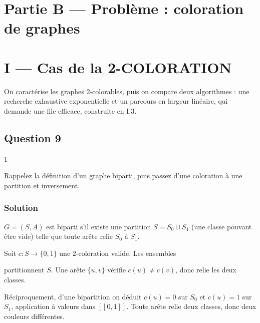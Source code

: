 \documentclass[11pt,a4paper]{article}
\newcommand{\equationajustee}[1]{%
  \sbox{\boiteequation}{$\displaystyle #1$}%
  \ifdim\wd\boiteequation>\linewidth
    \[\resizebox{\linewidth}{!}{\usebox{\boiteequation}}\]%
  \else
    \[#1\]%
  \fi}
\begin{document}
\hypertarget{partie-b-probluxe8me-coloration-de-graphes}{%
\section{Partie B --- Problème : coloration de graphes}\label{partie-b-probluxe8me-coloration-de-graphes}}

\hypertarget{i-cas-de-la-2-coloration}{%
\section{I --- Cas de la 2-COLORATION}\label{i-cas-de-la-2-coloration}}

On caractérise les graphes 2-colorables, puis on compare deux algorithmes : une recherche exhaustive exponentielle et un parcours en largeur linéaire, qui demande une file efficace, construite en I.3.

\hypertarget{question-9}{%
\subsection{Question 9}\label{question-9}}

\begin{indication}{1}

Rappelez la définition d'un graphe biparti, puis passez d'une coloration à une partition et inversement.

\end{indication}

\hypertarget{solution-8}{%
\subsubsection{Solution}\label{solution-8}}

\(G = (S, A)\) est biparti s'il existe une partition \(S = S_0 \sqcup S_1\) (une classe pouvant être vide) telle que toute arête relie \(S_0\) à \(S_1\).

Soit \(c : S \to \{0,1\}\) une 2-coloration valide. Les ensembles

\equationajustee{\begin{aligned}
S_0 &= c^{-1}(\{0\}) \\
S_1 &= c^{-1}(\{1\})
\end{aligned}}

partitionnent \(S\). Une arête \(\{u, v\}\) vérifie \(c(u) \neq c(v)\), donc relie les deux classes.

Réciproquement, d'une bipartition on déduit \(c(u) = 0\) sur \(S_0\) et \(c(u) = 1\) sur \(S_1\), application à valeurs dans \([\![0,1]\!]\). Toute arête relie deux classes, donc deux couleurs différentes.
\end{document}
